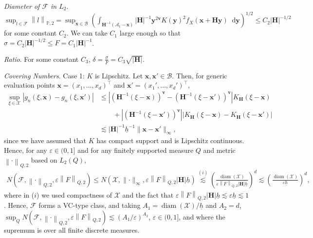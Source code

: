 \documentclass[10pt]{article}
\DeclareMathOperator{\diam}{diam}
\renewcommand{\P}{\mathbb{P}}
\newcommand{\dif}{\mathop{}\!\mathrm{d}}
\newcommand{\norm}[1]{\left\lVert#1\right\rVert}
\newcommand{\infnorm}[1]{\lVert #1 \rVert_{\infty}}
\newcommand{\bH}{\mathbf{H}}
\newcommand{\bv}{\mathbf{v}}
\newcommand{\bx}{\mathbf{x}}
\newcommand{\by}{\mathbf{y}}
\newcommand{\A}{\mathcal{A}}
\newcommand{\B}{\mathcal{B}}
\newcommand{\F}{\mathcal{F}}
\newcommand{\X}{\mathcal{X}}
\newcommand{\px}{\mathbf{x}'}
\begin{document}
\medskip\textit{Diameter of $\F$ in $L_2$}. $ \sup_{l \in \mathcal{F}} \norm{l}_{\P,2}
= \sup_{\bx \in \B}(\int_{\bH^{-1}(\A_t - \bx)} |\bH|^{-1}\by^{2\bv}K(\by)^2 f_X(\bx + \bH \by) \dif \by)^{1/2} \leq C_2 |\bH|^{-1/2}$ for some constant $C_2$. We can take $C_1$ large enough so that $\sigma = C_2 |\bH|^{-1/2} \leq F = C_1 |\bH|^{-1}$.

\medskip\textit{Ratio}. For some constant $C_3$, $\delta = \frac{\sigma}{F}  = C_3 \sqrt{|\bH|}$.

\medskip\textit{Covering Numbers}. Case 1: $K$ is Lipschitz. Let $\bx,\bx' \in \B$. Then, for generic evaluation points $\bx = (x_1,\ldots,x_d)^\top$ and $\bx' = (x_1',\ldots,x_d')^\top$,
\begin{align*}
    \sup_{\xi \in \X} \left|g_n(\xi,\bx) - g_n(\xi, \px) \right|
    & \leq  \left|(\bH^{-1}(\xi-\bx))^{\bv}  - (\bH^{-1}(\xi-\px))^{\bv} \right| K_{\bH}(\xi - \bx) \\
    & \qquad + |(\bH^{-1}(\xi-\px))^{\bv}| \Big|K_{\bH}(\xi - \bx) - K_{\bH}(\xi - \px) \Big| \\
    & \lesssim |\bH|^{-1}\underline h^{-1} \infnorm{\bx - \px},
\end{align*}
since we have assumed that $K$ has compact support and is Lipschitz continuous. Hence, for any $\varepsilon \in (0,1]$ and for any finitely supported measure $Q$ and metric $\norm{\cdot}_{Q,2}$ based on $L_2(Q)$,
\begin{align*}
    N(\F, \norm{\cdot}_{Q,2}, \varepsilon \norm{F}_{Q,2})
    \leq N(\X, \infnorm{\cdot}, \varepsilon \norm{F}_{Q,2} |\bH|\underline h)
    \stackrel{(i)}{\lesssim} \left(\frac{\diam(\X)}{ \varepsilon \norm{F}_{Q,2} |\bH|\underline h}\right)^d
    \lesssim \left(\frac{\diam(\X)}{\varepsilon \underline h}\right)^d,
\end{align*}
where in ($i$) we used compactness of $\X$ and the fact that $\varepsilon \norm{F}_{Q,2}|\bH|\underline h \lesssim \varepsilon \underline h \lesssim 1$. Hence, $\F$ forms a VC-type class, and taking $A_1 = \diam(\X)/\underline h$ and $A_2 = d$, $\sup_Q N(\F, \norm{\cdot}_{Q,2}, \varepsilon \norm{F}_{Q,2}) \lesssim (A_1/ \varepsilon)^{A_2}$, $\varepsilon \in (0,1]$, and where the supremum is over all finite discrete measures.
\end{document}
